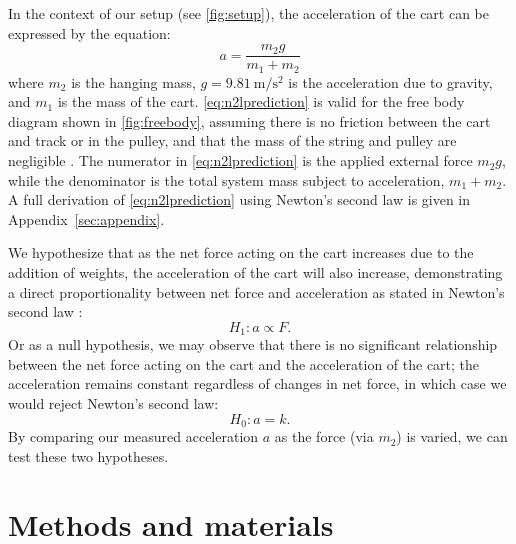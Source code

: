 ﻿\documentclass[reprint,amsmath,amssymb,aps,twoside]{revtex4-2}
\begin{document}
In the context of our setup (see \cref{fig:setup}), the acceleration of the cart can be expressed by the equation:
\begin{equation}
a = \frac{m_2 g}{m_1 + m_2}
\label{eq:n2lprediction}
\end{equation}
where $m_2$ is the hanging mass, $g=\qty{9.81}{\meter\per\second\squared}$ is the acceleration due to gravity, and $m_1$ is the mass of the cart. \cref{eq:n2lprediction} is valid for the free body diagram shown in \cref{fig:freebody}, assuming there is no friction between the cart and track or in the pulley, and that the mass of the string and pulley are negligible \cite{tipler}.  The numerator in \cref{eq:n2lprediction} is the applied external force $m_2 g$, while the denominator is the total system mass subject to acceleration, $m_1+m_2$.  A full derivation of \cref{eq:n2lprediction} using Newton's second law is given in Appendix~\ref{sec:appendix}. 

We hypothesize that as the net force acting on the cart increases due to the addition of weights, the acceleration of the cart will also increase, demonstrating a direct proportionality between net force and acceleration as stated in Newton's second law \cite{tipler}:
\begin{equation}
H_1: a \propto F.
\end{equation}
Or as a null hypothesis, we may observe that there is no significant relationship between the net force acting on the cart and the acceleration of the cart; the acceleration remains constant regardless of changes in net force, in which case we would reject Newton's second law:
\begin{equation}
H_0: a = k.
\end{equation}
By comparing our measured acceleration $a$ as the force (via $m_2$) is varied, we can test these two hypotheses. 









\section{Methods and materials}
\end{document}
